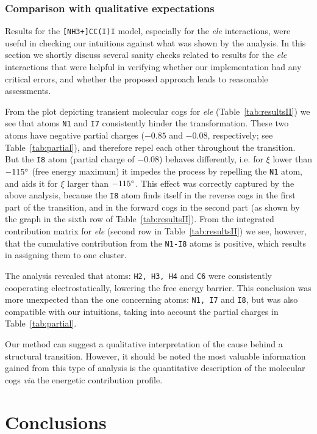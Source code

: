 \documentclass[a4paper,11pt,twoside]{book}%
\begin{document}
{\color{black}
\subsubsection{Comparison with qualitative expectations}
Results for the \texttt{[NH3+]CC(I)I} model, especially for the \emph{ele} interactions, were useful in checking our intuitions against what was shown by the analysis.
In this section we shortly discuss several sanity checks related to results for the \emph{ele} interactions that were helpful in verifying whether our implementation had any critical errors, and whether the proposed approach leads to reasonable assessments.

From the plot depicting transient molecular cogs for \emph{ele} (Table~\ref{tab:resultsII}) we see that atoms \texttt{N1} and \texttt{I7} consistently hinder the transformation.
These two atoms have negative partial charges ($-0.85$ and $-0.08$, respectively; see Table~\ref{tab:partial}), and therefore repel each other throughout the transition.
But the \texttt{I8} atom (partial charge of $-0.08$) behaves differently, i.e. for $\xi$ lower than $-115\degree$ (free energy maximum) it impedes the process by repelling the \texttt{N1} atom, and aids it for $\xi$ larger than $-115\degree$.
This effect was correctly captured by the above analysis, because the \texttt{I8} atom finds itself in the reverse cogs in the first part of the transition, and in the forward cogs in the second part (as shown by the graph in the sixth row of Table~\ref{tab:resultsII}).
From the integrated contribution matrix for \emph{ele} (second row in Table~\ref{tab:resultsII}) we see, however, that the cumulative contribution from the \texttt{N1-I8} atoms is positive, which results in assigning them to one cluster.

The analysis revealed that atoms: \texttt{H2, H3, H4} and \texttt{C6} were consistently cooperating electrostatically, lowering the free energy barrier.
This conclusion was more unexpected than the one concerning atoms: \texttt{N1, I7} and \texttt{I8}, but was also compatible with our intuitions, taking into account the partial charges in Table~\ref{tab:partial}.

Our method can suggest a qualitative interpretation of the cause behind a structural transition.
However, it should be noted the most valuable information gained from this type of analysis is the quantitative description of the molecular cogs \emph{via} the energetic contribution profile.
}

\section{Conclusions}
\end{document}
